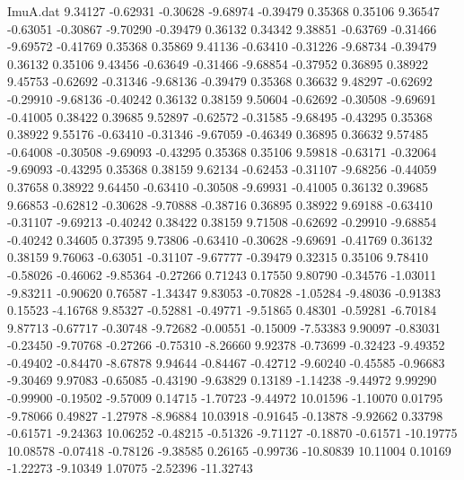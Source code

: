 \begin{filecontents}{ImuA.dat}
   9.34127   -0.62931   -0.30628   -9.68974   -0.39479    0.35368    0.35106
   9.36547   -0.63051   -0.30867   -9.70290   -0.39479    0.36132    0.34342
   9.38851   -0.63769   -0.31466   -9.69572   -0.41769    0.35368    0.35869
   9.41136   -0.63410   -0.31226   -9.68734   -0.39479    0.36132    0.35106
   9.43456   -0.63649   -0.31466   -9.68854   -0.37952    0.36895    0.38922
   9.45753   -0.62692   -0.31346   -9.68136   -0.39479    0.35368    0.36632
   9.48297   -0.62692   -0.29910   -9.68136   -0.40242    0.36132    0.38159
   9.50604   -0.62692   -0.30508   -9.69691   -0.41005    0.38422    0.39685
   9.52897   -0.62572   -0.31585   -9.68495   -0.43295    0.35368    0.38922
   9.55176   -0.63410   -0.31346   -9.67059   -0.46349    0.36895    0.36632
   9.57485   -0.64008   -0.30508   -9.69093   -0.43295    0.35368    0.35106
   9.59818   -0.63171   -0.32064   -9.69093   -0.43295    0.35368    0.38159
   9.62134   -0.62453   -0.31107   -9.68256   -0.44059    0.37658    0.38922
   9.64450   -0.63410   -0.30508   -9.69931   -0.41005    0.36132    0.39685
   9.66853   -0.62812   -0.30628   -9.70888   -0.38716    0.36895    0.38922
   9.69188   -0.63410   -0.31107   -9.69213   -0.40242    0.38422    0.38159
   9.71508   -0.62692   -0.29910   -9.68854   -0.40242    0.34605    0.37395
   9.73806   -0.63410   -0.30628   -9.69691   -0.41769    0.36132    0.38159
   9.76063   -0.63051   -0.31107   -9.67777   -0.39479    0.32315    0.35106
   9.78410   -0.58026   -0.46062   -9.85364   -0.27266    0.71243    0.17550
   9.80790   -0.34576   -1.03011   -9.83211   -0.90620    0.76587   -1.34347
   9.83053   -0.70828   -1.05284   -9.48036   -0.91383    0.15523   -4.16768
   9.85327   -0.52881   -0.49771   -9.51865    0.48301   -0.59281   -6.70184
   9.87713   -0.67717   -0.30748   -9.72682   -0.00551   -0.15009   -7.53383
   9.90097   -0.83031   -0.23450   -9.70768   -0.27266   -0.75310   -8.26660
   9.92378   -0.73699   -0.32423   -9.49352   -0.49402   -0.84470   -8.67878
   9.94644   -0.84467   -0.42712   -9.60240   -0.45585   -0.96683   -9.30469
   9.97083   -0.65085   -0.43190   -9.63829    0.13189   -1.14238   -9.44972
   9.99290   -0.99900   -0.19502   -9.57009    0.14715   -1.70723   -9.44972
  10.01596   -1.10070    0.01795   -9.78066    0.49827   -1.27978   -8.96884
  10.03918   -0.91645   -0.13878   -9.92662    0.33798   -0.61571   -9.24363
  10.06252   -0.48215   -0.51326   -9.71127   -0.18870   -0.61571  -10.19775
  10.08578   -0.07418   -0.78126   -9.38585    0.26165   -0.99736  -10.80839
  10.11004    0.10169   -1.22273   -9.10349    1.07075   -2.52396  -11.32743

\end{filecontents}
